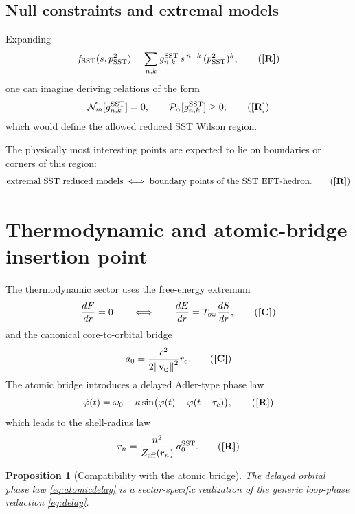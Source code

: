 \documentclass[11pt]{article}
\newcommand{\swirlarrow}{\mathchoice{\mkern-2mu\scriptstyle\boldsymbol{\circlearrowleft}}{\mkern-2mu\scriptstyle\boldsymbol{\circlearrowleft}}{\mkern-2mu\scriptscriptstyle\boldsymbol{\circlearrowleft}}{\mkern-2mu\scriptscriptstyle\boldsymbol{\circlearrowleft}}}
\newcommand{\vswirl}{\mathbf{v}_{\swirlarrow}}
\newcommand{\rc}{r_c}           %
\newcommand{\TagD}{\textbf{[D]}} %
\newcommand{\TagC}{\textbf{[C]}} %
\newcommand{\TagR}{\textbf{[R]}} %
\theoremstyle{definition}
\theoremstyle{plain}
\newtheorem{proposition}[definition]{Proposition}
\begin{document}
\subsection{Null constraints and extremal models}

Expanding
\begin{equation}
f_{\rm SST}(s,p_{\rm SST}^2)
=
\sum_{n,k} g^{\rm SST}_{n,k}\, s^{\,n-k}\,(p_{\rm SST}^2)^k,
\tag{\TagR}
\label{eq:fexp}
\end{equation}
one can imagine deriving relations of the form
\begin{equation}
\mathcal N_m[g^{\rm SST}_{n,k}] = 0,
\qquad
\mathcal P_\alpha[g^{\rm SST}_{n,k}] \ge 0,
\tag{\TagR}
\label{eq:nullpos}
\end{equation}
which would define the allowed reduced SST Wilson region.

The physically most interesting points are expected to lie on boundaries or corners of this region:
\begin{equation}
\text{extremal SST reduced models}
\;\Longleftrightarrow\;
\text{boundary points of the SST EFT-hedron.}
\tag{\TagR}
\label{eq:corners}
\end{equation}

\section{Thermodynamic and atomic-bridge insertion point}\label{sec:atomic}

The thermodynamic sector uses the free-energy extremum
\begin{equation}
\frac{dF}{dr}=0
\qquad\Longleftrightarrow\qquad
\frac{dE}{dr}=T_{\rm sw}\frac{dS}{dr},
\tag{\TagC}
\label{eq:freeE}
\end{equation}
and the canonical core-to-orbital bridge
\begin{equation}
a_0=\frac{c^2}{2\norm{\vswirl}^2}\rc.
\tag{\TagC}
\label{eq:a0}
\end{equation}
The atomic bridge introduces a delayed Adler-type phase law
\begin{equation}
\dot{\varphi}(t)=\omega_0-\kappa\sin\!\big(\varphi(t)-\varphi(t-\tau_c)\big),
\tag{\TagR}
\label{eq:atomicdelay}
\end{equation}
which leads to the shell-radius law
\begin{equation}
r_n=\frac{n^2}{Z_{\rm eff}(r_n)}\,a_0^{\rm SST}.
\tag{\TagR}
\label{eq:rn}
\end{equation}

\begin{proposition}[Compatibility with the atomic bridge]
The delayed orbital phase law \eqref{eq:atomicdelay} is a sector-specific realization of the generic loop-phase reduction \eqref{eq:delay}.
\tag{\TagD}
\end{proposition}
\end{document}

